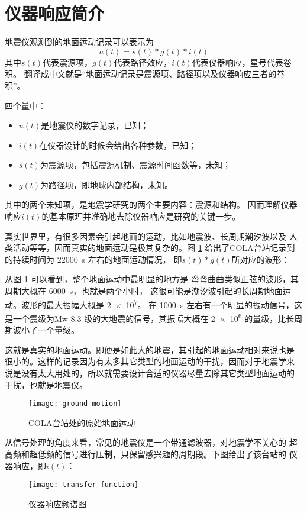 \section{仪器响应简介}
地震仪观测到的地面运动记录可以表示为
\[  u(t) = s(t) * g(t) * i(t) \]
其中$s(t)$代表震源项，$g(t)$代表路径效应，$i(t)$代表仪器响应，星号代表卷积。
翻译成中文就是``地面运动记录是震源项、路径项以及仪器响应三者的卷积''。

四个量中：
\begin{itemize}
\item $u(t)$是地震仪的数字记录，已知；
\item $i(t)$在仪器设计的时候会给出各种参数，已知；
\item $s(t)$为震源项，包括震源机制、震源时间函数等，未知；
\item $g(t)$为路径项，即地球内部结构，未知。
\end{itemize}
其中的两个未知项，是地震学研究的两个主要内容：震源和结构。
因而理解仪器响应$i(t)$的基本原理并准确地去除仪器响应是研究的关键一步。

真实世界里，有很多因素会引起地面的运动，比如地震波、长周期潮汐波以及
人类活动等等，因而真实的地面运动是极其复杂的。图 \ref{fig:ground-motion}
给出了COLA台站记录到的持续时间为 \SI{22000}{\s} 左右的地面运动情况，
即$s(t)*g(t)$所对应的波形：

从图 \ref{fig:ground-motion} 可以看到，整个地面运动中最明显的地方是
弯弯曲曲类似正弦的波形，其周期大概在 \SI{6000}{\s}，也就是两个小时，
这很可能是潮汐波引起的长周期地面运动。波形的最大振幅大概是 \num{2e7}。
在 \SI{1000}{\s} 左右有一个明显的振动信号，这是一个震级为Mw \num{8.3}
级的大地震的信号，其振幅大概在 \num{2e6} 的量级，比长周期波小了一个量级。

这就是真实的地面运动。即便是如此大的地震，其引起的地面运动相对来说也是
很小的。这样的记录因为有太多其它类型的地面运动的干扰，因而对于地震学来
说是没有太大用处的，所以就需要设计合适的仪器尽量去除其它类型地面运动的
干扰，也就是地震仪。

\begin{figure}[H]
\centering
\texttt{[image: ground-motion]}
\caption{COLA台站处的原始地面运动}
\label{fig:ground-motion}
\end{figure}

从信号处理的角度来看，常见的地震仪是一个带通滤波器，对地震学不关心的
超高频和超低频的信号进行压制，只保留感兴趣的周期段。下图给出了该台站的
仪器响应，即$i(t)$：

\begin{figure}[H]
\centering
\texttt{[image: transfer-function]}
\caption{仪器响应频谱图}
\label{fig:transfer-function}
\end{figure}

